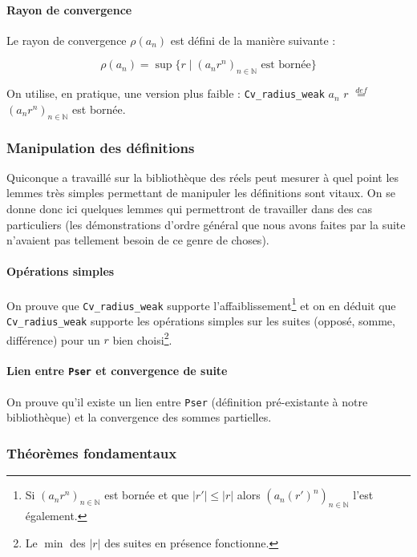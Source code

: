 \documentclass{article}
\newcommand{\coqcode}[1]{\texttt{#1}}
\begin{document}
\paragraph{Rayon de convergence} Le rayon de convergence $\rho\left(a_n\right)$ est défini de la manière suivante :

$$\rho\left(a_n\right) = \sup \lbrace r \mid (a_n r^n)_{n\in \mathbb{N}} \text{ est bornée} \rbrace$$

\noindent On utilise, en pratique, une version plus faible : \coqcode{Cv\_radius\_weak} $a_n$ $r$ $\stackrel{def}{=}$ $\left(a_n r^n\right)_{n\in \mathbb{N}}$ est bornée.

\subsubsection{Manipulation des définitions}

Quiconque a travaillé sur la bibliothèque des réels peut mesurer à quel point les lemmes très simples permettant de manipuler les définitions sont vitaux. On se donne donc ici quelques lemmes qui permettront de travailler dans des cas particuliers (les démonstrations d'ordre général que nous avons faites par la suite n'avaient pas tellement besoin de ce genre de choses).

\paragraph{Opérations simples} On prouve que \coqcode{Cv\_radius\_weak} supporte l'affaiblissement\footnote{Si $\left(a_n r^n\right)_{n\in \mathbb{N}}$ est bornée et que $|r'| \le |r|$ alors $\left(a_n (r')^n\right)_{n\in \mathbb{N}}$ l'est également.} et on en déduit que \coqcode{Cv\_radius\_weak} supporte les opérations simples sur les suites (opposé, somme, différence) pour un $r$ bien choisi\footnote{Le $\min$ des $|r|$ des suites en présence fonctionne.}.

\paragraph{Lien entre \coqcode{Pser} et convergence de suite} On prouve qu'il existe un lien entre \coqcode{Pser} (définition pré-existante à notre bibliothèque) et la convergence des sommes partielles.

\subsubsection{Théorèmes fondamentaux}
\end{document}

